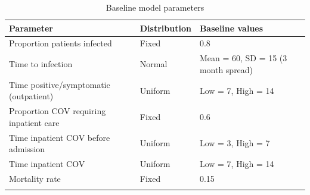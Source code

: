 \begin{minipage}{\textwidth}
\begin{longtable}[]{@{}lll@{}}
\caption{Baseline model parameters}\\
\toprule
\endhead
Parameter & Distribution & Baseline values\tabularnewline
\midrule
Proportion patients infected & Fixed & 0.8\tabularnewline
Time to infection & Normal & Mean = 60, SD = 15 (3 month spread)\tabularnewline
Time positive/symptomatic (outpatient) & Uniform & Low = 7, High =
14\tabularnewline
Proportion COV requiring inpatient care & Fixed & 0.6\tabularnewline
Time inpatient COV before admission & Uniform & Low = 3, High =
7\tabularnewline
Time inpatient COV & Uniform & Low = 7, High = 14\tabularnewline
Mortality rate & Fixed & 0.15\tabularnewline
\bottomrule
\label{tab:model_parameters}
\end{longtable}
\end{minipage}

